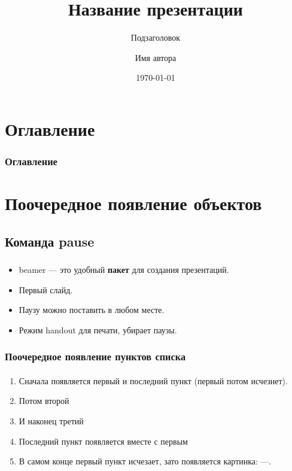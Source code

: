 \documentclass[russian]{beamer}
\author[Автор]{Имя автора}
\title[Презентация]{Название презентации}
\subtitle{Подзаголовок}
\date[Дата]{\today}
\institute[КемГУ]{Кемеровский государственный университет}
\begin{document}
	
\begin{frame}
	\maketitle
\end{frame}

\section{Оглавление}

\begin{frame}
	\frametitle{Оглавление}
	\tableofcontents %
\end{frame}

\section{Поочередное появление объектов}

\subsection{Команда pause}

\begin{frame}
	\frametitle{\insertsection}
	\framesubtitle{\insertsubsection}
	\begin{itemize}
		\item beamer --- это \alert{удобный} \textbf{пакет} для
		создания презентаций.
		\item Первый слайд. \pause
		\item Паузу можно поставить в любом \pause месте.
		\item Режим handout для печати, убирает паузы.
	\end{itemize}
\end{frame}

\begin{frame}
	\frametitle{Поочередное появление пунктов списка}
	\framesubtitle{\insertsubsection}
	\begin{enumerate}
		\item<1-5> Сначала появляется первый и последний пункт
		(первый потом исчезнет).
		\item<2-> Потом второй
		\item<3-> И наконец третий
		\item<1-> Последний пункт появляется вместе с первым
		\item<6-> В самом конце первый пункт исчезает, зато появляется
		картинка: ---.
	\end{enumerate}
\end{frame}
\end{document}
